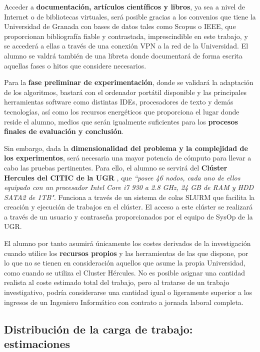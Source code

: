 Acceder a \textbf{documentación, artículos científicos y libros}, ya sea a nivel de Internet o de bibliotecas virtuales, será posible gracias a los convenios que tiene la Universidad de Granada con bases de datos tales como Scopus\cite{SCOPUS} o IEEE, que proporcionan bibliografía fiable y contrastada, imprescindible en este trabajo, y se accederá a ellas a través de una conexión VPN a la red de la Universidad. El alumno se valdrá también de una libreta donde documentará de forma escrita aquellas fases o hitos que considere necesarios.

Para la \textbf{fase preliminar de experimentación}, donde se validará la adaptación de los algoritmos, bastará con el ordenador portátil disponible y las principales herramientas software como distintas IDEs, procesadores de texto y demás tecnologías, así como los recursos energéticos que proporciona el lugar donde reside el alumno, medios que serán igualmente suficientes para los \textbf{procesos finales de evaluación y conclusión}. 

Sin embargo, dada la \textbf{dimensionalidad del problema y la complejidad de los experimentos}, será necesaria una mayor potencia de cómputo para llevar a cabo las pruebas pertinentes. Para ello, el alumno se servirá del \textbf{Clúster Hercules del CITIC de la UGR} \cite{HERCULES}, que \textit{``posee 46 nodos, cada uno de ellos equipado con un procesador Intel Core i7 930 a 2.8 GHz, 24 GB de RAM y HDD SATA2 de 1TB"}. Funciona a través de un sistema de colas SLURM\cite{SLURM} que facilita la creación y ejecución de trabajos en el clúster. El acceso a este clúster se realizará a través de un usuario y contraseña proporcionados por el equipo de SysOp de la UGR.

El alumno por tanto asumirá únicamente los costes derivados de la investigación cuando utilice los \textbf{recursos propios} y las herramientas de las que dispone, por lo que no se tienen en consideración aquellos que asume la propia Universidad, como cuando se utiliza el Cluster Hércules. No es posible asignar una cantidad realista al coste estimado total del trabajo, pero al tratarse de un trabajo investigativo, podría considerarse una cantidad igual o ligeramente superior a los ingresos de un Ingeniero Informático con contrato a jornada laboral completa.

\subsection{Distribución de la carga de trabajo: estimaciones}

